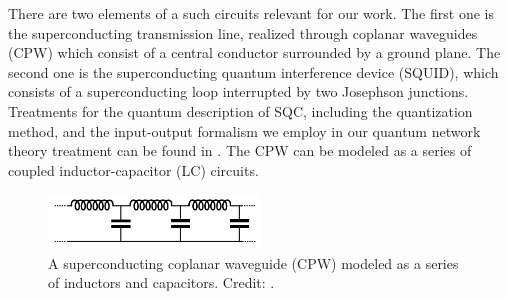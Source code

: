 There are two elements of a such circuits relevant for our work. The first one is the superconducting transmission line, realized through coplanar waveguides (CPW) which consist of a central conductor surrounded by a ground plane. The second one is the superconducting quantum interference device (SQUID), which consists of a superconducting loop interrupted by two Josephson junctions.
Treatments for the quantum description of SQC, including the quantization method, and the input-output formalism 
we employ in our quantum network theory treatment can be found in \cite{Yurke1984, Vool2017}. 
The CPW can be modeled as a series of coupled inductor-capacitor (LC) circuits. 

\begin{figure}[h]
    \centering
    \includegraphics[width=0.5\textwidth,keepaspectratio]{figures/intro/LC_Vool2017.png}
    \caption{A superconducting coplanar waveguide (CPW) modeled as a series of inductors and capacitors. Credit: \protect\cite{Vool2017}.}
    \label{fig:CPW_diagram}
\end{figure}

